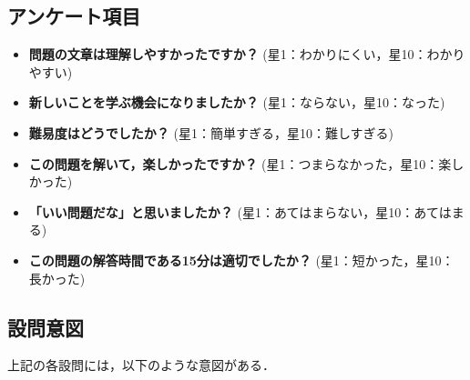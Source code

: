\documentclass[11pt]{jreport}
\begin{document}
\subsection{アンケート項目}

\begin{itemize}
    \item \textbf{問題の文章は理解しやすかったですか？} (星1：わかりにくい，星10：わかりやすい)
    \item \textbf{新しいことを学ぶ機会になりましたか？} (星1：ならない，星10：なった)
    \item \textbf{難易度はどうでしたか？} (星1：簡単すぎる，星10：難しすぎる)
    \item \textbf{この問題を解いて，楽しかったですか？} (星1：つまらなかった，星10：楽しかった)
    \item \textbf{「いい問題だな」と思いましたか？} (星1：あてはまらない，星10：あてはまる)
    \item \textbf{この問題の解答時間である15分は適切でしたか？} (星1：短かった，星10：長かった)
\end{itemize}

\subsection{設問意図}

上記の各設問には，以下のような意図がある．
\end{document}
